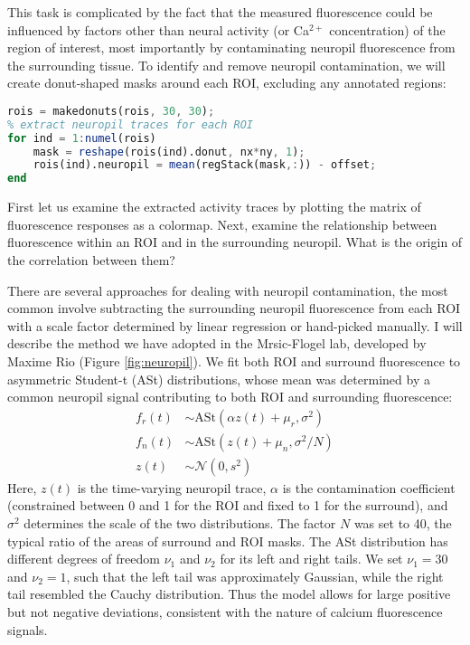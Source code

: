 \documentclass[a4paper]{report}
\newcommand{\nexercise}[0]{\arabic{exercises}\addtocounter{exercises}{1}}
\begin{document}
This task is complicated by the fact that the measured fluorescence could be influenced by factors other than neural activity (or Ca$^{2+}$ concentration) of the region of interest, most importantly by contaminating neuropil fluorescence from the surrounding tissue.
To identify and remove neuropil contamination, we will create donut-shaped masks around each ROI, excluding any annotated regions:
\begin{lstlisting}[language=Octave]
% make neuropil masks around each cell excluding other labeled cells
rois = makedonuts(rois, 30, 30);
% extract neuropil traces for each ROI
for ind = 1:numel(rois)
    mask = reshape(rois(ind).donut, nx*ny, 1);
    rois(ind).neuropil = mean(regStack(mask,:)) - offset;
end
\end{lstlisting}
\begin{exercisebox}[frametitle={Exercise \nexercise: Neuropil contamination}]
First let us examine the extracted activity traces by plotting the matrix of fluorescence responses as a colormap.
Next, examine the relationship between fluorescence within an ROI and in the surrounding neuropil. What is the origin of the correlation between them?
\end{exercisebox}

There are several approaches for dealing with neuropil contamination, the most common involve subtracting the surrounding neuropil fluorescence from each ROI with a scale factor determined by linear regression or hand-picked manually. I will describe the method we have adopted in the Mrsic-Flogel lab, developed by Maxime Rio (Figure \ref{fig:neuropil}). 
We fit both ROI and surround fluorescence to asymmetric Student-t (ASt) distributions, whose mean was determined by a common neuropil signal contributing to both ROI and surrounding fluorescence:
\begin{align}
	f_r(t) &\sim \mathrm{ASt}(\alpha z(t) + \mu_r, \sigma^2) \\
	f_n(t) &\sim \mathrm{ASt}(z(t) + \mu_n, \sigma^2 / N) \label{eq:ast_n}\\
	z(t) &\sim \mathcal{N}(0, s^2)
\end{align}
Here, $z(t)$ is the time-varying neuropil trace, $\alpha$ is the contamination coefficient (constrained between 0 and 1 for the ROI and fixed to 1 for the surround), and $\sigma^2$ determines the scale of the two distributions. 
The factor $N$ was set to 40, the typical ratio of the areas of surround and ROI masks. 
The ASt distribution has different degrees of freedom $\nu_1$ and $\nu_2$ for its left and right tails. 
We set $\nu_1=30$ and $\nu_2=1$, such that the left tail was approximately Gaussian, while the right tail resembled the Cauchy distribution. 
Thus the model allows for large positive but not negative deviations, consistent with the nature of calcium fluorescence signals.
\end{document}
